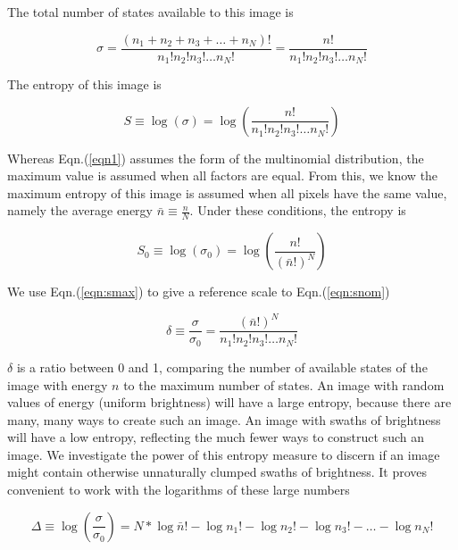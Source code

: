 \documentclass[11pt]{article} %
\begin{document}
The total number of states available to this image is

\begin{equation}
\sigma = \frac{\left( n_{1} + n_{2} + n_{3} + \ldots + n_{N} \right)!}{n_{1}!n_{2}!n_{3}! \ldots n_{N}!} = \frac{n!}{n_{1}!n_{2}!n_{3}! \ldots n_{N}!}
\end{equation}

The entropy of this image is

\begin{equation}\label{eqn:snom}
S \equiv \log \left( \sigma \right) = \log \left( \frac{n!}{n_{1}!n_{2}!n_{3}! \ldots n_{N}!}\right)
\end{equation}

Whereas Eqn.(\ref{eqn1}) assumes the form of the multinomial distribution, the maximum value is assumed when all factors are equal.
From this, we know the maximum entropy of this image is assumed when all pixels have the same value, namely the average energy $\bar{n} \equiv \frac{n}{N}$.
Under these conditions, the entropy is

\begin{equation}\label{eqn:smax}
S_{0} \equiv \log \left( \sigma_{0} \right) = \log \left( \frac{n!}{\left( \bar{n}! \right)^{N}} \right)
\end{equation}

We use Eqn.(\ref{eqn:smax}) to give a reference scale to Eqn.(\ref{eqn:snom})

\begin{equation}
\delta \equiv \frac{\sigma}{\sigma_{0}} =  \frac{\left( \bar{n}! \right)^{N}}{n_{1}!n_{2}!n_{3}! \ldots n_{N}!}
\end{equation}

$\delta$ is a ratio between 0 and 1, comparing the number of available states of the image with energy $n$ to the maximum number of states.
An image with random values of energy (uniform brightness) will have a large entropy, because there are many, many ways to create such an image.
An image with swaths of brightness will have a low entropy, reflecting the much fewer ways to construct such an image.
We investigate the power of this entropy measure to discern if an image might contain otherwise unnaturally clumped swaths of brightness.
It proves convenient to work with the logarithms of these large numbers

\begin{equation}\label{eqn:delta}
\Delta \equiv \log \left( \frac{\sigma}{\sigma_{0}} \right) =  {N * \log \bar{n}!} - {\log n_{1}! - \log n_{2}! - \log n_{3}! - \ldots - \log n_{N}!}
\end{equation}
\end{document}
